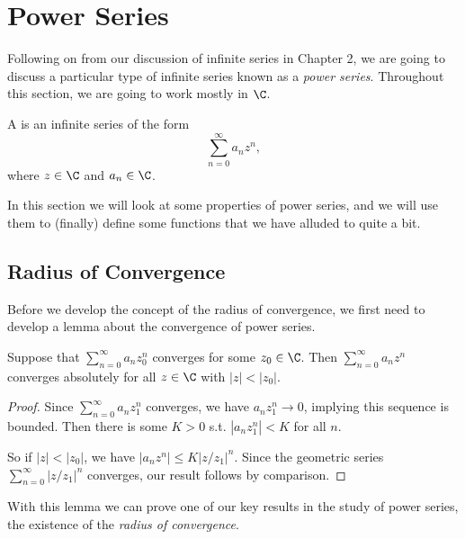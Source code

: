 \section{Power Series}

Following on from our discussion of infinite series in Chapter 2, we are going to discuss a particular type of infinite series known as a \emph{power series}. Throughout this section, we are going to work mostly in $\C$.

\begin{definition}
	A  is an infinite series of the form
	$$
		\sum_{n = 0}^{\infty} a_n z^n,
	$$
	where $z \in \C$ and $a_n \in \C$.
\end{definition}

In this section we will look at some properties of power series, and we will use them to (finally) define some functions that we have alluded to quite a bit.

\subsection{Radius of Convergence}

Before we develop the concept of the radius of convergence, we first need to develop a lemma about the convergence of power series. 

\begin{lemma}
Suppose that $\sum_{n = 0}^{\infty} a_n z_0^n$ converges for some $z_0 \in \C$. Then $\sum_{n = 0}^{\infty} a_n z^n$ converges absolutely for all $z\in \C$ with $|z| < |z_0|$.
\end{lemma}
\begin{proof}
Since $\sum_{n = 0}^{\infty} a_n z_1^n$ converges, we have $a_n z_1^n \rightarrow 0$, implying this sequence is bounded.
Then there is some $K > 0$ s.t. $|a_n z_1^n| < K$ for all $n$.	

So if $|z| < |z_0|$, we have $|a_n z^n| \leq K \left|z/z_1\right|^n$. Since the geometric series $\sum_{n = 0}^{\infty} |z/z_1|^n$ converges, our result follows by comparison.
\end{proof}

With this lemma we can prove one of our key results in the study of power series, the existence of the \emph{radius of convergence}.

